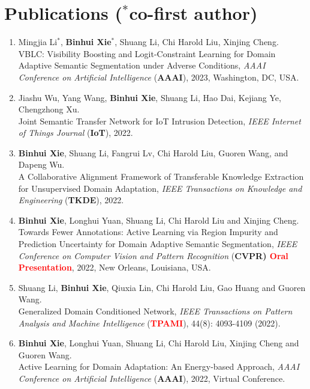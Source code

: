 \documentclass[letterpaper,11pt]{article}
\begin{document}
\section{Publications ($^*$co-first author)}
\begin{enumerate}
    \item Mingjia Li$^*$, \textbf{Binhui Xie$^*$}, Shuang Li, Chi Harold Liu, Xinjing Cheng. \\
    VBLC: Visibility Boosting and Logit-Constraint Learning for Domain Adaptive Semantic Segmentation under Adverse Conditions, \textit{AAAI Conference on Artificial Intelligence} ({\bf AAAI}), 2023, Washington, DC, USA.

    \item Jiashu Wu, Yang Wang, \textbf{Binhui Xie}, Shuang Li, Hao Dai, Kejiang Ye, Chengzhong Xu. \\
    Joint Semantic Transfer Network for IoT Intrusion Detection, \textit{IEEE Internet of Things Journal} ({\bf IoT}), 2022.

    \item  \textbf{Binhui Xie}, Shuang Li, Fangrui Lv, Chi Harold Liu, Guoren Wang, and Dapeng Wu. \\
    A Collaborative Alignment Framework of Transferable Knowledge Extraction for Unsupervised Domain Adaptation, \textit{IEEE Transactions on Knowledge and Engineering} ({\bf TKDE}), 2022.

    \item \textbf{Binhui Xie}, Longhui Yuan, Shuang Li, Chi Harold Liu and Xinjing Cheng. \\
    Towards Fewer Annotations: Active Learning via Region Impurity and Prediction Uncertainty for Domain Adaptive Semantic Segmentation, \textit{IEEE Conference on Computer Vision and Pattern Recognition} ({\bf CVPR) \textcolor{red}{Oral Presentation}}, 2022, New Orleans, Louisiana, USA.

    \item Shuang Li, {\bf Binhui Xie}, Qiuxia Lin, Chi Harold Liu, Gao Huang and Guoren Wang. \\
    Generalized Domain Conditioned Network, \textit{IEEE Transactions on Pattern Analysis and Machine Intelligence} ({\bf \textcolor{red}{TPAMI}}), 44(8): 4093-4109 (2022).

    \item \textbf{Binhui Xie}, Longhui Yuan, Shuang Li, Chi Harold Liu, Xinjing Cheng and Guoren Wang. \\
    Active Learning for Domain Adaptation: An Energy-based Approach, \textit{AAAI Conference on Artificial Intelligence} ({\bf AAAI}), 2022, Virtual Conference.


\end{enumerate}
\end{document}
